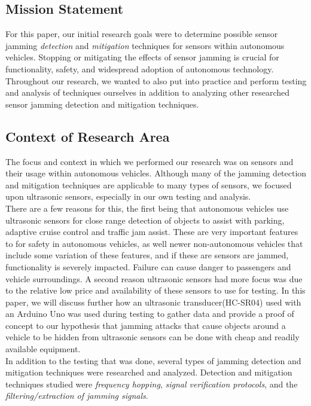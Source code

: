 \documentclass[conference]{IEEEtran}
\begin{document}
\subsection{Mission Statement}
For this paper, our initial research goals were to determine possible sensor jamming \textit{detection} and \textit{mitigation} techniques for sensors within autonomous vehicles. Stopping or mitigating the effects of sensor jamming is crucial for functionality, safety, and widespread adoption of autonomous technology. Throughout our research, we wanted to also put into practice and perform testing and analysis of techniques ourselves in addition to analyzing other researched sensor jamming detection and mitigation techniques. \\

\subsection{Context of Research Area}
The focus and context in which we performed our research was on sensors and their usage within autonomous vehicles. Although many of the jamming detection and mitigation techniques are applicable to many types of sensors, we focused upon ultrasonic sensors, especially in our own testing and analysis.\\ \indent There are a few reasons for this, the first being that autonomous vehicles use ultrasonic sensors for close range detection of objects to assist with parking, adaptive cruise control and traffic jam assist\cite{10}. These are very important features to for safety in autonomous vehicles, as well newer non-autonomous vehicles that include some variation of these features, and if these are sensors are jammed, functionality is severely impacted. Failure can cause danger to passengers and vehicle surroundings. A second reason ultrasonic sensors had more focus was due to the relative low price and availability of these sensors to use for testing. In this paper, we will discuss further how an ultrasonic transducer(HC-SR04) used with an Arduino Uno was used during testing to gather data and provide a proof of concept to our hypothesis that jamming attacks that cause objects around a vehicle to be hidden from ultrasonic sensors can be done with cheap and readily available equipment.\\
\indent In addition to the testing that was done, several types of jamming detection and mitigation techniques were researched and analyzed. Detection and mitigation techniques studied were \textit{frequency hopping}\cite{2}\cite{4}, \textit{signal verification protocols}\cite{6}\cite{7}, and the \textit{filtering/extraction of jamming signals}\cite{4}\cite{5}.\\
\end{document}
